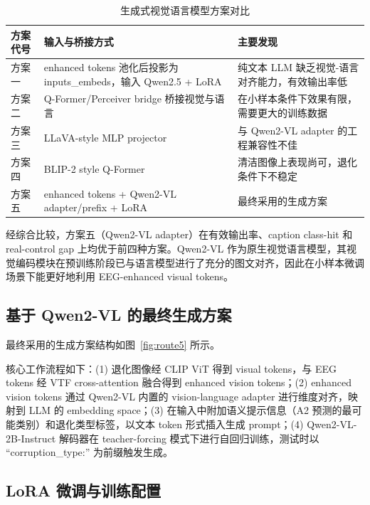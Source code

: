 \begin{table}[htbp]
  \centering
  \caption{生成式视觉语言模型方案对比}
  \label{tab:route-comparison}
  \begin{tabularx}{\linewidth}{l l X}
    \toprule
    方案代号 & 输入与桥接方式 & 主要发现 \\
    \midrule
    方案一 & enhanced tokens 池化后投影为 inputs\_embeds，输入 Qwen2.5 + LoRA & 纯文本 LLM 缺乏视觉-语言对齐能力，有效输出率低 \\
    方案二 & Q-Former/Perceiver bridge 桥接视觉与语言 & 在小样本条件下效果有限，需要更大的训练数据 \\
    方案三 & LLaVA-style MLP projector & 与 Qwen2-VL adapter 的工程兼容性不佳 \\
    方案四 & BLIP-2 style Q-Former & 清洁图像上表现尚可，退化条件下不稳定 \\
    方案五 & enhanced tokens + Qwen2-VL adapter/prefix + LoRA & 最终采用的生成方案 \\
    \bottomrule
  \end{tabularx}
\end{table}

经综合比较，方案五（Qwen2-VL adapter）在有效输出率、caption class-hit 和 real-control gap 上均优于前四种方案。Qwen2-VL 作为原生视觉语言模型，其视觉编码模块在预训练阶段已与语言模型进行了充分的图文对齐，因此在小样本微调场景下能更好地利用 EEG-enhanced visual tokens。

\subsection{基于 Qwen2-VL 的最终生成方案}

最终采用的生成方案结构如图~\ref{fig:route5} 所示。


核心工作流程如下：(1) 退化图像经 CLIP ViT 得到 visual tokens，与 EEG tokens 经 VTF cross-attention 融合得到 enhanced vision tokens；(2) enhanced vision tokens 通过 Qwen2-VL 内置的 vision-language adapter 进行维度对齐，映射到 LLM 的 embedding space；(3) 在输入中附加语义提示信息（A2 预测的最可能类别）和退化类型标签，以文本 token 形式插入生成 prompt；(4) Qwen2-VL-2B-Instruct 解码器在 teacher-forcing 模式下进行自回归训练，测试时以 ``corruption\_type:'' 为前缀触发生成。

\subsection{LoRA 微调与训练配置}

